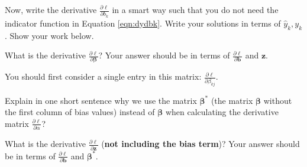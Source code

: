 \documentclass[11pt,addpoints,answers]{exam}
\newcommand{\bv}{\mathbf{b}}
\newcommand{\yv}{\mathbf{y}}
\newcommand{\zv}{\mathbf{z}}
\newcommand{\betav      }{\boldsymbol \beta      }
\begin{document}
\begin{questions}
\begin{parts}
\begin{subparts}
    \begin{your_solution}[title=${\partial \ell}/{\partial b_2}$, height=6cm, width=15cm]
    \end{your_solution}

    \subpart[3] Now, write the derivative $\frac{\partial \ell}{\partial b_k}$ in a smart way such that you do not need the indicator function in Equation \ref{eqn:dydbk}. Write your solutions in terms of $\hat{y}_k,y_k$. Show your work below.
    
    \begin{your_solution}[title=$\partial \ell / \partial b_k$,height=10cm,width=15cm]
    \end{your_solution}
    
    \clearpage
    
    
    
    \subpart[2] What is the derivative $\frac{\partial \ell}{\partial \betav}$? Your answer should be in terms of $\frac{\partial \ell}{\partial \bv}$ and $\zv$. 
    
    You should first consider a single entry in this matrix: $\frac{\partial \ell}{\partial \beta_{kj}}$.
    
    \begin{your_solution}[title=$\partial \ell/\partial \betav$,height=6cm,width=15cm]
    \end{your_solution}
    
    
    \subpart[1] Explain in one short sentence why we use the matrix $\betav^*$ (the matrix $\betav$ without the first column of bias values) instead of $\betav$ when calculating the derivative matrix $\frac{\partial \ell}{\partial \alpha}$?
    
    
    \begin{your_solution}[title=Answer,height=3cm,width=15cm]
    \end{your_solution}

    \subpart[1] What is the derivative $\frac{\partial \ell}{\partial \zv}$ (\textbf{not including the bias term})? Your answer should be in terms of $\frac{\partial \ell}{\partial \bv}$ and $\betav^*$.
    

\end{subparts}
\end{parts}
\end{questions}
\end{document}
